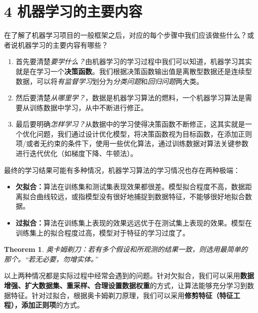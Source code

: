 \documentclass[twoside]{article}
\newtheorem{theorem}{Theorem}
\begin{document}
\section*{4  机器学习的主要内容}
\label{机器学习的主要内容}
在了解了机器学习项目的一般框架之后，对应的每个步骤中我们应该做些什么？或者说机器学习的主要内容有哪些？
\begin{enumerate}
    \item 首先要清楚\textit{要学什么？}由机器学习的学习过程中我们可以知道，机器学习其实就是在学习一个\textbf{决策函数}。我们根据决策函数输出值是离散型数据还是连续型数据，可以将\textit{有监督学习}划分为\textit{分类问题}和\textit{回归问题}两大类。
    \item 然后要清楚\textit{从哪里学？}，数据是机器学习算法的燃料，一个机器学习算法是需要从训练数据中学习，从中不断进行修正。
    \item 最后要明确\textit{怎样学习？}从数据中的学习使得决策函数不断修正，这其实就是一个优化问题，我们通过设计优化模型，将决策函数视为目标函数，在添加正则项/或者无约束的条件下，使用一些优化算法，通过训练数据对算法关键参数进行迭代优化（如梯度下降、牛顿法）。
\end{enumerate}
最终的学习结果可能有多种情况，机器学习算法的学习情况也存在两种极端：
\begin{itemize}
    \item \textbf{欠拟合：}算法在训练集和测试集表现效果都很差。模型拟合程度不高，数据距离拟合曲线较远，或指模型没有很好地捕捉到数据特征，不能够很好地拟合数据。
    \item \textbf{过拟合：}算法在训练集上表现的效果远远优于在测试集上表现的效果。模型在训练集上的拟合程度过高，模型对于特征的学习过度了。
\end{itemize}
\begin{theorem}
    奥卡姆剃刀：若有多个假设和所观测的结果一致，则选用最简单的那个。“若无必要，勿增实体。”
\end{theorem}
以上两种情况都是实际过程中经常会遇到的问题。针对欠拟合，我们可以采用\textbf{数据增强、扩大数据集、重采样、合理设置数据权重}的方式，让算法能够充分学习到数据特征。针对过拟合，根据奥卡姆剃刀原理，我们可以采用\textbf{修剪特征（特征工程），添加正则项}的方式。

\clearpage
{} \vspace{2mm} \\
\end{document}
